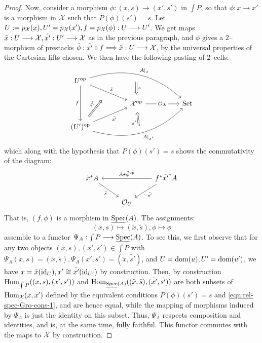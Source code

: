 \documentclass[11pt]{amsart}
\begin{document}
\begin{proof}
Now, consider a morphism $\phi : (x, s) \to (x', s')$ in $\int P$, so that
$\phi : x \to x'$ is a morphism in $\mathcal{X}$ such that $P(\phi)(s') = s$.
Let $U := p_\mcX(x), U' = p_\mcX(x'), f = p_\mcX(\phi) : U \to U'$.
We get maps $\tilde{x} : U \to \mcX, \tilde{x'} : U' \to \mcX$ as in the
previous paragraph, and $\phi$ gives a $2$--morphism of prestacks
$\tilde{\phi} : \tilde{x'} \circ f \To \tilde{x} : U \to \mcX$, by
the universal properties of the Cartesian lifts chosen.
We then have the following pasting of $2$--cells:
\begin{equation}
\begin{tikzcd}[column sep=huge]
U^\op
  \ar[dd, "f" left]
  \ar[rd, "\tilde{x}" above right, ""{below left, name={x}}]
  \ar[rrd, bend left, "A|_x", ""{name=AU, below left}] & & \\ &
|[alias=X]|\mcX^\op
  \ar[r, "\mcO_\mcX" description]
  \ar[from=AU, Rightarrow, "s", shorten=0.5em] &
\Set \\
(U')^\op
  \ar[ru, "\tilde{x'}" below right]
  \ar[rru, bend right, "A|_{x'}" below right, ""{name=AD, above left}]
  \ar[from=AD, to=X, Rightarrow, "s'", shorten=0.5em]
  \ar[to=x, Rightarrow, shorten=0.75em, "\tilde{\phi}"] & &
\end{tikzcd}
\end{equation}
which along with the hypothesis that $P(\phi)(s') = s$ shows the commutativity
of the diagram:
\begin{equation}\label{eqn:rel-spec-Gro-cons-1}
\begin{tikzcd}
\tilde{x}^*A
  \ar[rd, "\tilde{s}" below left]
  \ar[from=rr, "A \star \tilde{\phi}^\op" above] & &
f^*\tilde{x'}^*A \ar[ld, "\tilde{s'}" below right] \\
& \mcO_U &
\end{tikzcd}
\end{equation}
That is, $(f, \phi)$ is a morphism in $\underline{\mathrm{Spec}}(A)$.
The assignments:
\[
(x, s) \mapsto (\tilde{x}, \tilde{s}),
\phi \mapsto \phi
\]
assemble to a functor $\Psi_A : \int P \to \ul\Spec(A)$. To see this, we first
observe that for any two objects $(x, s), (x', s') \in \int P$ with
$\Psi_A(x, s) = (\tilde{x}, \tilde{s}),
\Psi_A(x', s') = (\tilde{x}, \tilde{s'})$, and $U = \mathrm{dom}(u), U' = \mathrm{dom}(u')$, we
have $x = \tilde{x}(\mathrm{id}_U), x' \cong \tilde{x'}(\mathrm{id}_{U'})$ by construction.
Then, by construction $\mathrm{Hom}_{\int P}((x, s), (x', s'))$ and
$\mathrm{Hom}_{\underline{\mathrm{Spec}}(A)}((\tilde{x}, \tilde{s}), (\tilde{x'}, \tilde{s'}))$ are both
subsets of $\mathrm{Hom}_\mathcal{X}(x, x')$ defined by the equivalent conditions
$P(\phi)(s') = s$ and \ref{eqn:rel-spec-Gro-cons-1}, and are hence
equal, while the mapping of morphisms induced by $\Psi_A$ is just the identity
on this subset. Thus, $\Psi_A$ respects composition and identities, and is, at
the same time, fully faithful.
This functor commutes with the maps to $\mathcal{X}$ by construction.


\end{proof}
\end{document}
